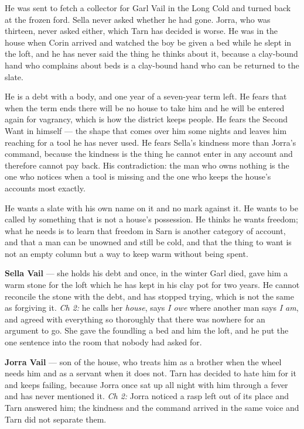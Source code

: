 \documentclass{design/chronicle}
\begin{document}
{He was sent to fetch a collector for Garl Vail in the Long Cold and turned back at the frozen ford. Sella never asked whether he had gone. Jorra, who was thirteen, never asked either, which Tarn has decided is worse. He was in the house when Corin arrived and watched the boy be given a bed while he slept in the loft, and he has never said the thing he thinks about it, because a clay-bound hand who complains about beds is a clay-bound hand who can be returned to the slate.

He is a debt with a body, and one year of a seven-year term left. He fears that when the term ends there will be no house to take him and he will be entered again for vagrancy, which is how the district keeps people. He fears the Second Want in himself — the shape that comes over him some nights and leaves him reaching for a tool he has never used. He fears Sella’s kindness more than Jorra’s command, because the kindness is the thing he cannot enter in any account and therefore cannot pay back. His contradiction: the man who owns nothing is the one who notices when a tool is missing and the one who keeps the house’s accounts most exactly.

He wants a slate with his own name on it and no mark against it. He wants to be called by something that is not a house’s possession. He thinks he wants freedom; what he needs is to learn that freedom in Sarn is another category of account, and that a man can be unowned and still be cold, and that the thing to want is not an empty column but a way to keep warm without being spent.

\textbf{Sella Vail} — she holds his debt and once, in the winter Garl died, gave him a warm stone for the loft which he has kept in his clay pot for two years. He cannot reconcile the stone with the debt, and has stopped trying, which is not the same as forgiving it. \emph{Ch 2:} he calls her \emph{house}, says \emph{I owe} where another man says \emph{I am}, and agreed with everything so thoroughly that there was nowhere for an argument to go. She gave the foundling a bed and him the loft, and he put the one sentence into the room that nobody had asked for.

\textbf{Jorra Vail} — son of the house, who treats him as a brother when the wheel needs him and as a servant when it does not. Tarn has decided to hate him for it and keeps failing, because Jorra once sat up all night with him through a fever and has never mentioned it. \emph{Ch 2:} Jorra noticed a rasp left out of its place and Tarn answered him; the kindness and the command arrived in the same voice and Tarn did not separate them.

}
\end{document}

